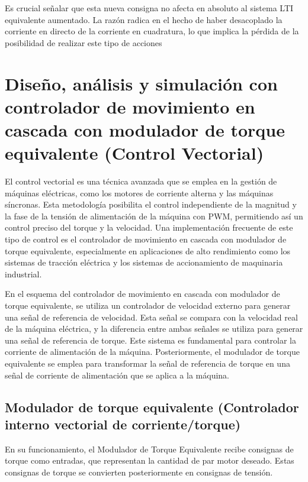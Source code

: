 \documentclass{article}
\begin{document}
Es crucial señalar que esta nueva consigna no afecta en absoluto al sistema LTI equivalente aumentado. 
La razón radica en el hecho de haber desacoplado la corriente en directo de la corriente en 
cuadratura, lo que implica la pérdida de la posibilidad de realizar este tipo de acciones



\section{Diseño, análisis y simulación con controlador de movimiento en cascada con modulador de torque equivalente (Control Vectorial)}

El control vectorial es una técnica avanzada que se emplea en la gestión de máquinas eléctricas, como 
los motores de corriente alterna y las máquinas síncronas. Esta metodología posibilita el control 
independiente de la magnitud y la fase de la tensión de alimentación de la máquina con PWM, permitiendo así 
un control preciso del torque y la velocidad. Una implementación frecuente de este tipo de control es 
el controlador de movimiento en cascada con modulador de torque equivalente, especialmente en aplicaciones 
de alto rendimiento como los sistemas de tracción eléctrica y los sistemas de accionamiento de maquinaria 
industrial.

En el esquema del controlador de movimiento en cascada con modulador de torque equivalente, se utiliza 
un controlador de velocidad externo para generar una señal de referencia de velocidad. Esta señal se 
compara con la velocidad real de la máquina eléctrica, y la diferencia entre ambas señales se utiliza 
para generar una señal de referencia de torque. Este sistema es fundamental para controlar la corriente 
de alimentación de la máquina. Posteriormente, el modulador de torque equivalente se emplea para 
transformar la señal de referencia de torque en una señal de corriente de alimentación que se aplica 
a la máquina.


\subsection{Modulador de torque equivalente (Controlador interno vectorial de corriente/torque)}

En su funcionamiento, el Modulador de Torque Equivalente recibe consignas de torque como entradas, 
que representan la cantidad de par motor deseado. Estas consignas de torque se convierten posteriormente 
en consignas de tensión.
\end{document}
